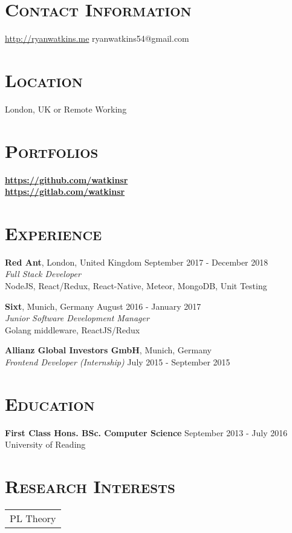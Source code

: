\documentclass[line, margin, 10pt]{res}
\begin{document}
\renewcommand{\namefont}{ \LARGE \bf }


\begin{resume}

\section{\textsc{Contact Information}}
\url{http://ryanwatkins.me} \hfill {ryanwatkins54@gmail.com}\\

\section{\textsc{Location}}
London, UK or Remote Working

\section{\textsc{Portfolios}}
        {\bf \url{https://github.com/watkinsr}}\\
        {\hfill {\bf \url{https://gitlab.com/watkinsr}}}

\section{\textsc{Experience}}

{\bf Red Ant}, London, United Kingdom {\hfill September 2017 -  December 2018}\\
{\it Full Stack Developer} \\
NodeJS, React/Redux, React-Native, Meteor, MongoDB, Unit Testing

{\bf Sixt}, Munich, Germany {\hfill August 2016 - January 2017}\\
{\it Junior Software Development Manager} \\
Golang middleware, ReactJS/Redux

{\bf Allianz Global Investors GmbH}, Munich, Germany\\
{\it Frontend Developer (Internship)} {\hfill July 2015 - September 2015}

\section{\textsc{Education}}
{\bf First Class Hons. BSc. Computer Science}  {\hfill September 2013 - July 2016}\\
University of Reading

\section{\textsc{Research Interests}}
\begin{tabular}[t]{@{} p{6.0 in}  @{}}
  PL Theory\\
\end{tabular}


\end{resume}
\end{document}
